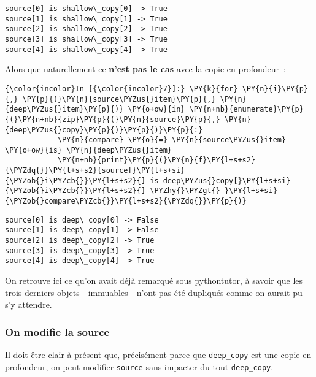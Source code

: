     \begin{Verbatim}[commandchars=\\\{\}]
source[0] is shallow\_copy[0] -> True
source[1] is shallow\_copy[1] -> True
source[2] is shallow\_copy[2] -> True
source[3] is shallow\_copy[3] -> True
source[4] is shallow\_copy[4] -> True

    \end{Verbatim}

    Alors que naturellement ce \textbf{n'est pas le cas} avec la copie en
profondeur~:

    \begin{Verbatim}[commandchars=\\\{\}]
{\color{incolor}In [{\color{incolor}7}]:} \PY{k}{for} \PY{n}{i}\PY{p}{,} \PY{p}{(}\PY{n}{source\PYZus{}item}\PY{p}{,} \PY{n}{deep\PYZus{}item}\PY{p}{)} \PY{o+ow}{in} \PY{n+nb}{enumerate}\PY{p}{(}\PY{n+nb}{zip}\PY{p}{(}\PY{n}{source}\PY{p}{,} \PY{n}{deep\PYZus{}copy}\PY{p}{)}\PY{p}{)}\PY{p}{:}
            \PY{n}{compare} \PY{o}{=} \PY{n}{source\PYZus{}item} \PY{o+ow}{is} \PY{n}{deep\PYZus{}item}
            \PY{n+nb}{print}\PY{p}{(}\PY{n}{f}\PY{l+s+s2}{\PYZdq{}}\PY{l+s+s2}{source[}\PY{l+s+si}{\PYZob{}i\PYZcb{}}\PY{l+s+s2}{] is deep\PYZus{}copy[}\PY{l+s+si}{\PYZob{}i\PYZcb{}}\PY{l+s+s2}{] \PYZhy{}\PYZgt{} }\PY{l+s+si}{\PYZob{}compare\PYZcb{}}\PY{l+s+s2}{\PYZdq{}}\PY{p}{)}
\end{Verbatim}


    \begin{Verbatim}[commandchars=\\\{\}]
source[0] is deep\_copy[0] -> False
source[1] is deep\_copy[1] -> False
source[2] is deep\_copy[2] -> True
source[3] is deep\_copy[3] -> True
source[4] is deep\_copy[4] -> True

    \end{Verbatim}

    On retrouve ici ce qu'on avait déjà remarqué sous pythontutor, à savoir
que les trois derniers objets - immuables - n'ont pas été dupliqués
comme on aurait pu s'y attendre.

    \hypertarget{on-modifie-la-source}{%
\subsubsection{On modifie la source}\label{on-modifie-la-source}}

    Il doit être clair à présent que, précisément parce que
\texttt{deep\_copy} est une copie en profondeur, on peut modifier
\texttt{source} sans impacter du tout \texttt{deep\_copy}.


